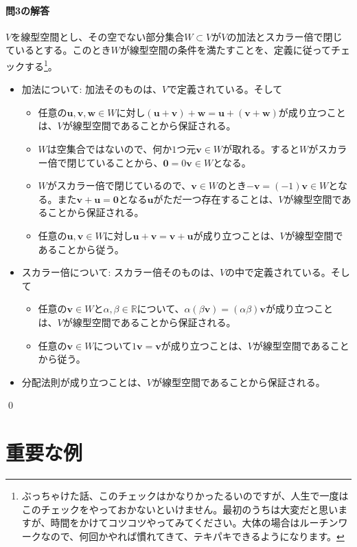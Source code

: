 \paragraph{問3の解答} $V$を線型空間とし、その空でない部分集合$W\subset V$が$V$の加法とスカラー倍で閉じているとする。このとき$W$が線型空間の条件を満たすことを、定義に従ってチェックする\footnote{ぶっちゃけた話、このチェックはかなりかったるいのですが、人生で一度はこのチェックをやっておかないといけません。最初のうちは大変だと思いますが、時間をかけてコツコツやってみてください。大体の場合はルーチンワークなので、何回かやれば慣れてきて、テキパキできるようになります。}。
\begin{itemize}
\item 加法について: 加法そのものは、$V$で定義されている。そして
\begin{itemize}
\item 任意の$\bm{u}, \bm{v}, \bm{w}\in W$に対し$(\bm{u} + \bm{v}) + \bm{w} = \bm{u} + (\bm{v} + \bm{w})$が成り立つことは、$V$が線型空間であることから保証される。
\item $W$は空集合ではないので、何か$1$つ元$\bm{v}\in W$が取れる。すると$W$がスカラー倍で閉じていることから、$\bm{0} = 0 \bm{v} \in W$となる。
\item $W$がスカラー倍で閉じているので、$\bm{v} \in W$のとき$-\bm{v} = (-1)\bm{v} \in W$となる。また$\bm{v} + \bm{u} = \bm{0}$となる$\bm{u}$がただ一つ存在することは、$V$が線型空間であることから保証される。
\item 任意の$\bm{u}, \bm{v}\in W$に対し$\bm{u} + \bm{v} = \bm{v} + \bm{u}$が成り立つことは、$V$が線型空間であることから従う。
\end{itemize}
\item スカラー倍について: スカラー倍そのものは、$V$の中で定義されている。そして
\begin{itemize}
\item 任意の$\bm{v} \in W$と$\alpha, \beta \in \mathbb{R}$について、$\alpha(\beta \bm{v}) = (\alpha\beta)\bm{v}$が成り立つことは、$V$が線型空間であることから保証される。
\item 任意の$\bm{v} \in W$について$1\bm{v} = \bm{v}$が成り立つことは、$V$が線型空間であることから従う。
\end{itemize}
\item 分配法則が成り立つことは、$V$が線型空間であることから保証される。
\end{itemize}
\qed

\section{重要な例}

